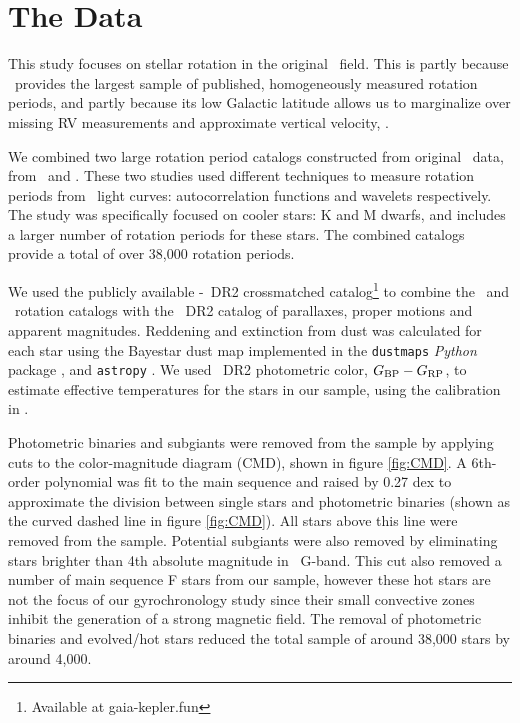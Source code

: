 \section{The Data}
\label{sec:data}

This study focuses on stellar rotation in the original \kepler\ field.
This is partly because \kepler\ provides the largest sample of published,
homogeneously measured rotation periods, and partly because its low Galactic
latitude allows us to marginalize over missing RV measurements and approximate
vertical velocity, \vz.

We combined two large rotation period catalogs constructed from original
\kepler\ data, from \mct\ and \sant.
These two studies used different techniques to measure rotation periods from
\kepler\ light curves: autocorrelation functions and wavelets respectively.
The \citet{santos2019} study was specifically focused on cooler stars: K and M
dwarfs, and includes a larger number of rotation periods for these stars.
The combined catalogs provide a total of over 38,000 rotation periods.

We used the publicly available \kepler-\gaia\ DR2 crossmatched
catalog\footnote{Available at gaia-kepler.fun} to combine the \mct\ and \sant\
rotation catalogs with the \gaia\ DR2 catalog of parallaxes, proper motions
and apparent magnitudes.
Reddening and extinction from dust was calculated for each star using the
Bayestar dust map implemented in the {\tt dustmaps} {\it Python} package
\citep{green2018}, and {\tt astropy} \citep{astropy2013, astropy2018}.
We used \gaia\ DR2 photometric color, $G_{\rm BP} - G_{\rm RP}$, to estimate
effective temperatures for the stars in our sample, using the calibration in
\citet{curtis2020}.

Photometric binaries and subgiants were removed from the sample by applying
cuts to the color-magnitude diagram (CMD), shown in figure \ref{fig:CMD}.
A 6th-order polynomial was fit to the main sequence and raised by 0.27 dex to
approximate the division between single stars and photometric binaries (shown
as the curved dashed line in figure \ref{fig:CMD}).
All stars above this line were removed from the sample.
Potential subgiants were also removed by eliminating stars brighter than 4th
absolute magnitude in \gaia\ G-band.
This cut also removed a number of main sequence F stars from our sample,
however these hot stars are not the focus of our gyrochronology study since
their small convective zones inhibit the generation of a strong magnetic
field.
The removal of photometric binaries and evolved/hot stars reduced the total
sample of around 38,000 stars by around 4,000.

